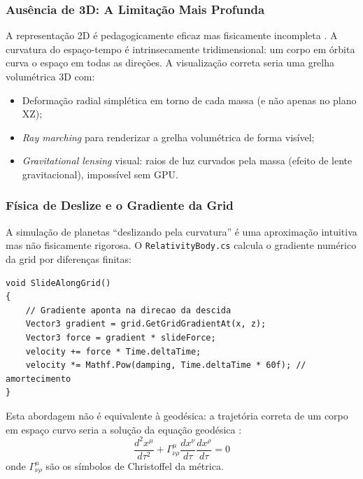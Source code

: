 \documentclass[12pt,a4paper]{article}
\begin{document}
\subsubsection{Aus\^{e}ncia de 3D: A Limita\c{c}\~{a}o Mais Profunda}

A representa\c{c}\~{a}o 2D \'{e} pedagogicamente eficaz mas fisicamente incompleta \cite{thorne2014}. A curvatura do espa\c{c}o-tempo \'{e} intrinsecamente tridimensional: um corpo em \'{o}rbita curva o espa\c{c}o em todas as dire\c{c}\~{o}es. A visualiza\c{c}\~{a}o correta seria uma grelha volum\'{e}trica 3D com:

\begin{itemize}
  \item Deforma\c{c}\~{a}o radial simpl\'{e}tica em torno de cada massa (e n\~{a}o apenas no plano XZ);
  \item \textit{Ray marching} para renderizar a grelha volum\'{e}trica de forma vis\'{i}vel;
  \item \textit{Gravitational lensing} visual: raios de luz curvados pela massa (efeito de lente gravitacional), imposs\'{i}vel sem GPU.
\end{itemize}

\subsubsection{F\'{i}sica de Deslize e o Gradiente da Grid}

A simula\c{c}\~{a}o de planetas ``deslizando pela curvatura'' \'{e} uma aproxima\c{c}\~{a}o intuitiva mas n\~{a}o fisicamente rigorosa. O \texttt{RelativityBody.cs} calcula o gradiente num\'{e}rico da grid por diferen\c{c}as finitas:

\begin{lstlisting}[caption={RelativityBody.cs - gradiente num\'{e}rico da grid por diferen\c{c}as finitas}]
void SlideAlongGrid()
{
    // Gradiente aponta na direcao da descida
    Vector3 gradient = grid.GetGridGradientAt(x, z);
    Vector3 force = gradient * slideForce;
    velocity += force * Time.deltaTime;
    velocity *= Mathf.Pow(damping, Time.deltaTime * 60f); // amortecimento
}
\end{lstlisting}

Esta abordagem n\~{a}o \'{e} equivalente \`{a} geod\'{e}sica: a trajet\'{o}ria correta de um corpo em espa\c{c}o curvo seria a solu\c{c}\~{a}o da equa\c{c}\~{a}o geod\'{e}sica \cite{schwarzschild1916,thorne2014}:
\begin{equation}
\frac{d^2 x^\mu}{d\tau^2} + \Gamma^\mu_{\nu\rho}\frac{dx^\nu}{d\tau}\frac{dx^\rho}{d\tau} = 0
\end{equation}
onde $\Gamma^\mu_{\nu\rho}$ s\~{a}o os s\'{i}mbolos de Christoffel da m\'{e}trica.
\end{document}
